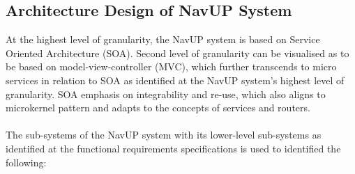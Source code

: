 \documentclass[12pt]{article}
\begin{document}
\subsection{Architecture Design of NavUP System}
At the highest level of granularity, the NavUP system  is based on Service Oriented Architecture (SOA).  Second level of granularity can be visualised as to be based on model-view-controller (MVC), which further transcends to micro services in relation to SOA as identified at the NavUP system’s  highest level of granularity.  SOA  emphasis on integrability and re-use, which also aligns to microkernel pattern and adapts to the concepts of services and routers.
\\
\\
The sub-systems of the NavUP  system with its lower-level sub-systems as identified at the functional requirements specifications is used to identified the following:
\end{document}
